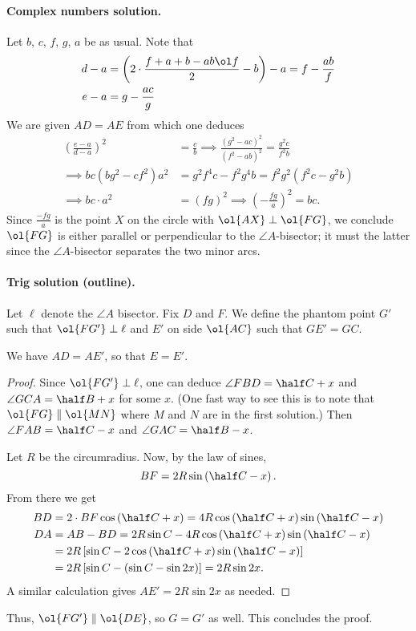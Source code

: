 \documentclass[11pt]{scrartcl}
\begin{document}
\paragraph{Complex numbers solution.}
Let $b$, $c$, $f$, $g$, $a$ be as usual.
Note that
\begin{align*}
  d-a &= \left( 2 \cdot \frac{f+a+b-ab\ol f}{2} -b \right)-a
    = f - \frac{ab}{f} \\
  e-a &= g - \frac{ac}{g}
\end{align*}
We are given $AD = AE$ from which one deduces
\begin{align*}
  \left( \frac{e-a}{d-a} \right)^2 &= \frac cb
  \implies \frac{(g^2-ac)^2}{(f^2-ab)^2} = \frac{g^2 c}{f^2 b} \\
  \implies bc(bg^2-cf^2)a^2 &= g^2f^4c - f^2g^4b = f^2g^2(f^2c-g^2b) \\
  \implies bc \cdot a^2 &= (fg)^2 \implies \left( -\frac{fg}{a} \right)^2 = bc.
\end{align*}
Since $\frac{-fg}{a}$ is the point $X$ on the circle
with $\ol{AX} \perp \ol{FG}$,
we conclude $\ol{FG}$ is either parallel or perpendicular
to the $\angle A$-bisector; it must the latter
since the $\angle A$-bisector separates the two minor arcs.

\paragraph{Trig solution (outline).}
Let $\ell$ denote the $\angle A$ bisector.
Fix $D$ and $F$.
We define the phantom point $G'$ such that $\ol{FG'} \perp \ell$
and $E'$ on side $\ol{AC}$ such that $GE'=GC$.
\begin{claim*}
  We have $AD = AE'$, so that $E = E'$.
\end{claim*}
\begin{proof}
  Since $\ol{FG'} \perp \ell$,
  one can deduce $\angle FBD = \half C + x$
  and $\angle GCA = \half B + x$ for some $x$.
  (One fast way to see this is to note that $\ol{FG} \parallel \ol{MN}$
  where $M$ and $N$ are in the first solution.)
  Then $\angle FAB = \half C -x$ and $\angle GAC = \half B - x$.

  Let $R$ be the circumradius.
  Now, by the law of sines,
  \[ BF = 2R \sin\left( \half C - x \right). \]
  From there we get
  \begin{align*}
  BD &= 2 \cdot BF \cos\left(\half C + x\right)
    = 4R \cos\left(\half C+x\right) \sin \left(\half C-x\right) \\
  DA &= AB - BD = 2R\sin C
    - 4R\cos\left(\half C+x\right) \sin\left(\half C -x\right) \\
  &= 2R\left[ \sin C - 2\cos\left( \half C + x \right) \sin \left( \half C -x \right) \right] \\
  &= 2R\left[ \sin C - \left( \sin C - \sin 2x  \right) \right]
  = 2R \sin 2x.
  \end{align*}
  A similar calculation gives $AE' = 2R \sin 2x$ as needed.
\end{proof}
Thus, $\ol{FG'} \parallel \ol{DE}$, so $G = G'$ as well.
This concludes the proof.
\end{document}
